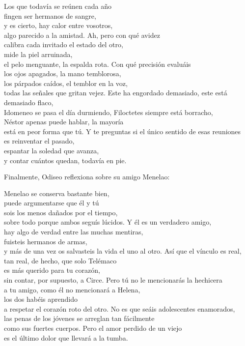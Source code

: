 \begin{versopropio}
Los que todavía se reúnen cada año\\
fingen ser hermanos de sangre,\\
y es cierto, hay calor entre vosotros,\\
algo parecido a la amistad.
\stanzabreak
Ah, pero con qué avidez\\
calibra cada invitado el estado del otro,\\
mide la piel arruinada,\\
el pelo menguante, la espalda rota.
\stanzabreak
Con qué precisión evaluáis\\
los ojos apagados, la mano temblorosa,\\
los párpados caídos, el temblor en la voz,\\
todas las señales que gritan vejez.
\stanzabreak
Este ha engordado demasiado, este está demasiado flaco,\\
Idomeneo se pasa el día durmiendo, Filoctetes siempre está borracho,\\
Néstor apenas puede hablar, la mayoría\\
está en peor forma que tú.
\stanzabreak
Y te preguntas si el único sentido de esas reuniones\\
es reinventar el pasado,\\
espantar la soledad que avanza,\\
y contar cuántos quedan, todavía en pie.
\end{versopropio}

Finalmente, Odiseo reflexiona sobre su amigo Menelao:

\begin{versopropio}
Menelao se conserva bastante bien,\\
puede argumentarse que él y tú\\
sois los menos dañados por el tiempo,\\
sobre todo porque ambos seguís lúcidos.
\stanzabreak
Y él es un verdadero amigo,\\
hay algo de verdad entre las muchas mentiras,\\
fuisteis hermanos de armas,\\
y más de una vez os salvasteis la vida el uno al otro.
\stanzabreak
Así que el vínculo es real,\\
tan real, de hecho, que solo Telémaco\\
es más querido para tu corazón,\\
sin contar, por supuesto, a Circe.
\stanzabreak
Pero tú no le mencionarás la hechicera\\
a tu amigo, como él no mencionará a Helena,\\
los dos habéis aprendido\\
a respetar el corazón roto del otro.
\stanzabreak
No es que seáis adolescentes enamorados,\\
las penas de los jóvenes se arreglan tan fácilmente\\
como sus fuertes cuerpos. Pero el amor perdido de un viejo\\
es el último dolor que llevará a la tumba.
\end{versopropio}


